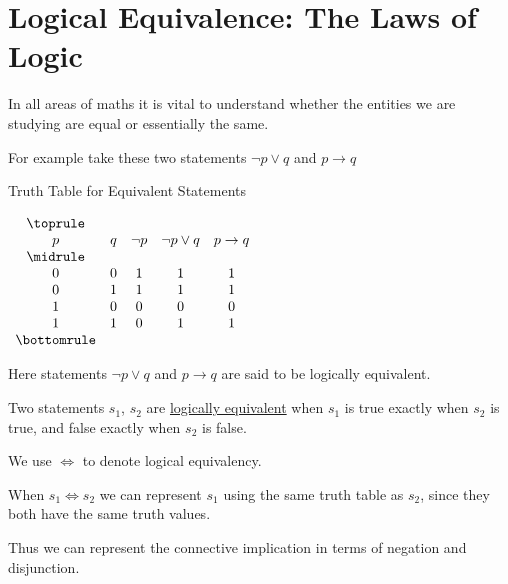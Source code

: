 
%
\section{Logical Equivalence: The Laws of Logic}

In all areas of maths it is vital to understand whether the
entities we are studying are equal or essentially the same.

\newcommand\negporq{\neg p \lor q}
\newcommand\ptoq{p \to q}

For example take these two statements $\negporq$
and $\ptoq$

\begin{table}
    \centering
    \caption*{Truth Table for Equivalent Statements}
    \label{tbl:equivalent-statements}
    \begin{subtable}{\linewidth}
        \centering
        $\begin{array}{ *{5}{c} }
            \toprule \\
            p & q & \neg p & \negporq & \ptoq \\
            \midrule \\
            0 & 0 & 1 & 1 & 1 \\
            0 & 1 & 1 & 1 & 1 \\
            1 & 0 & 0 & 0 & 0 \\
            1 & 1 & 0 & 1 & 1 \\
            \bottomrule
        \end{array}$
    \end{subtable}%
\end{table}

Here statements $\negporq$ and $\ptoq$
are said to be logically equivalent.

\begin{definition}
    Two statements $s_1$, $s_2$ are \underline{logically equivalent} when $s_1$ is true
    exactly when $s_2$ is true, and false exactly when $s_2$ is false.
\end{definition}

We use $\iff$ to denote logical equivalency.

When $s_1 \iff s_2$ we can represent $s_1$ using the same truth table as $s_2$,
since they both have the same truth values.

Thus we can represent the connective implication in terms of negation and disjunction.

